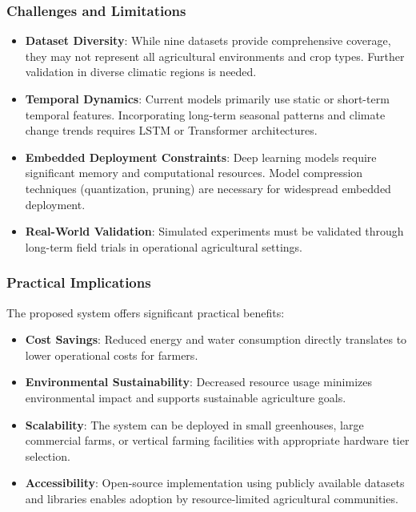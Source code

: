 \documentclass[conference]{IEEEtran}
\begin{document}
\subsubsection{Challenges and Limitations}

\begin{itemize}
\item \textbf{Dataset Diversity}: While nine datasets provide comprehensive coverage, they may not represent all agricultural environments and crop types. Further validation in diverse climatic regions is needed.

\item \textbf{Temporal Dynamics}: Current models primarily use static or short-term temporal features. Incorporating long-term seasonal patterns and climate change trends requires LSTM or Transformer architectures.

\item \textbf{Embedded Deployment Constraints}: Deep learning models require significant memory and computational resources. Model compression techniques (quantization, pruning) are necessary for widespread embedded deployment.

\item \textbf{Real-World Validation}: Simulated experiments must be validated through long-term field trials in operational agricultural settings.
\end{itemize}

\subsubsection{Practical Implications}

The proposed system offers significant practical benefits:
\begin{itemize}
\item \textbf{Cost Savings}: Reduced energy and water consumption directly translates to lower operational costs for farmers.

\item \textbf{Environmental Sustainability}: Decreased resource usage minimizes environmental impact and supports sustainable agriculture goals.

\item \textbf{Scalability}: The system can be deployed in small greenhouses, large commercial farms, or vertical farming facilities with appropriate hardware tier selection.

\item \textbf{Accessibility}: Open-source implementation using publicly available datasets and libraries enables adoption by resource-limited agricultural communities.
\end{itemize}
\end{document}
